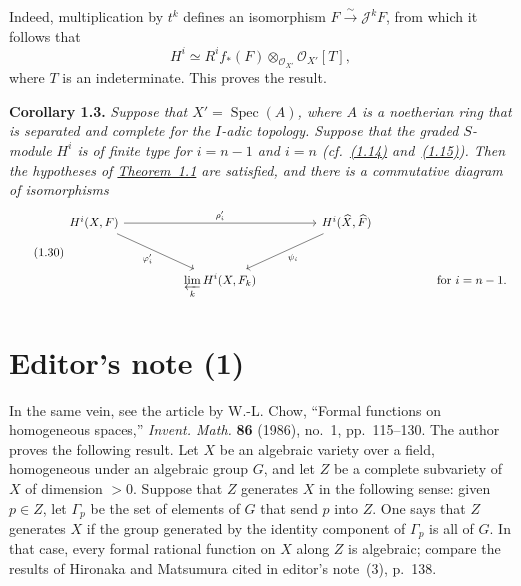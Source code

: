 Indeed, multiplication by $t^k$ defines an isomorphism
$F\xrightarrow{\sim}\mathcal J^kF$, from which it follows that
\begin{equation}
\tag{1.29}\label{eq:IX.1.29}
H^i\simeq R^i f_*(F)\otimes_{\mathcal O_{X'}}\mathcal O_{X'}[T],
\end{equation}
where $T$ is an indeterminate. This proves the result.

\noindent\textbf{Corollary 1.3.}\quad
\emph{Suppose that $X'=\operatorname{Spec}(A)$, where $A$ is a noetherian ring
that is separated and complete for the $I$-adic topology. Suppose that the
graded $S$-module $H^i$ is of finite type for $i=n-1$ and $i=n$
(cf.~\hyperref[eq:IX.1.14]{(1.14)} and~\hyperref[eq:IX.1.15]{(1.15)}). Then the hypotheses of \hyperref[IX.1.1]{Theorem~1.1} are satisfied, and
there is a commutative diagram of isomorphisms}
\begin{equation}
\tag{1.30}\label{eq:IX.1.30}
\begin{tikzcd}[column sep=4.6em,row sep=3.0em]
H^i(X,F)
  \arrow[rr,"\rho_i'"]
  \arrow[dr,"\varphi_i'"']
&& H^i(\widehat X,\widehat F)
  \arrow[dl,"\psi_i"] \\
& \displaystyle\varprojlim_k H^i(X,F_k)
&& \text{for }i=n-1.
\end{tikzcd}
\end{equation}

\section*{Editor's note (1)}
In the same vein, see the article by W.-L. Chow, ``Formal functions on
homogeneous spaces,'' \emph{Invent. Math.} \textbf{86} (1986), no.~1,
pp.~115--130. The author proves the following result. Let $X$ be an algebraic
variety over a field, homogeneous under an algebraic group $G$, and let $Z$ be
a complete subvariety of $X$ of dimension $>0$. Suppose that $Z$ generates $X$
in the following sense: given $p\in Z$, let $\Gamma_p$ be the set of elements
of $G$ that send $p$ into $Z$. One says that $Z$ generates $X$ if the group
generated by the identity component of $\Gamma_p$ is all of $G$. In that case,
every formal rational function on $X$ along $Z$ is algebraic; compare the
results of Hironaka and Matsumura cited in editor's note~(3), p.~138.

